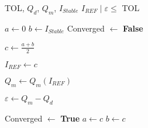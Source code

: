 \begin{algorithmic}[1]

\Require TOL, $Q_{d}$, $Q_{m}$, $I_{Stable}$
\Ensure $I_{REF} \; | \; \varepsilon \leq$ TOL

\State $a \gets 0$
\State $b \gets I_{Stable}$
\State Converged $\gets$ \textbf{False}
 

    \State $c \gets \frac{a+b}{2}$

    \State $I_{REF} \gets c$ 

    \State $Q_{m} \gets Q_{m}\left(I_{REF}\right)$ 

    \State $\varepsilon \gets Q_m - Q_d $

     Converged $\gets$ \textbf{True} 
        \Else
                \State $a \gets c$
            \EndIf
                \State $b \gets c$
            \EndIf
    \EndIf

\EndWhile
\end{algorithmic}